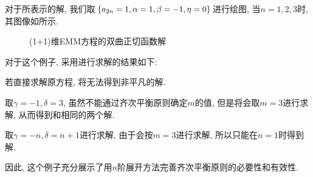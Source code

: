 \begin{example}
对于所表示的解, 我们取$\left\{a_{2n}=1,\alpha=1,\beta=-1,\eta=0\right\}$进行绘图, 当$n=1,2,3$时, 其图像如所示. 
\begin{figure}[ht]
\centering
{}
\caption{(1+1)维EMM方程的双曲正切函数解} \label{emm-tanh}
\end{figure}

对于这个例子, 采用进行求解的结果如下: 
\begin{compactitem}[\textbullet]
\item 若直接求解原方程, 将无法得到非平凡的解.
\item 取$\gamma=-1,\delta=3$, 虽然不能通过齐次平衡原则确定$m$的值, 但是将会取$m=3$进行求解, 从而得到和相同的两个解. 
\item 取$\gamma=-n,\delta=n+1$进行求解, 由于会按$m=3$进行求解, 所以只能在$n=1$时得到解. 
\end{compactitem}

因此, 这个例子充分展示了用$n$阶展开方法完善齐次平衡原则的必要性和有效性.
\end{example}

